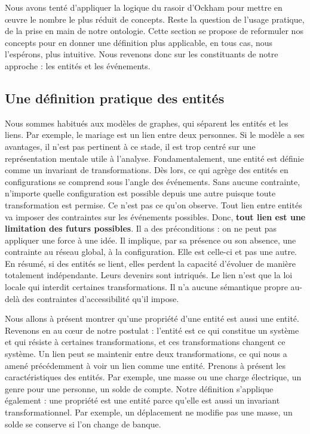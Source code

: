 \documentclass{report}
\begin{document}
	Nous avons tenté d'appliquer la logique du rasoir d'Ockham pour mettre en œuvre le nombre le plus réduit de concepts. Reste la question de l'usage pratique, de la prise en main de notre ontologie. Cette section se propose de reformuler nos concepts pour en donner une définition plus applicable, en tous cas, nous l'espérons, plus intuitive. Nous revenons donc sur les constituants de notre approche : les entités et les événements. 
	
	
	\subsection*{Une définition pratique des entités}
	
		Nous sommes habitués aux modèles de graphes, qui séparent les entités et les liens. Par exemple, le mariage est un lien entre deux personnes. Si le modèle a ses avantages, il n'est pas pertinent à ce stade, il est trop centré sur une représentation mentale utile à l'analyse. Fondamentalement, une entité est définie comme un invariant de transformations. Dès lors, ce qui agrège des entités en configurations se comprend sous l'angle des événements. Sans aucune contrainte, n'importe quelle configuration est possible depuis une autre puisque toute transformation est permise. Ce n'est pas ce qu'on observe. Tout lien entre entités va imposer des contraintes sur les événements possibles. Donc, \textbf{tout lien est une limitation des futurs possibles}. Il a des préconditions : on ne peut pas appliquer une force à une idée. Il implique, par sa présence ou son absence, une contrainte au réseau global, à la configuration. Elle est celle-ci et pas une autre. En résumé, si des entités se lient, elles perdent la capacité d'évoluer de manière totalement indépendante. Leurs devenirs sont intriqués. Le lien n'est que la loi locale qui interdit certaines transformations. Il n'a aucune sémantique propre au-delà des contraintes d'accessibilité qu'il impose.
		
		
		
		Nous allons à présent montrer qu'une propriété d'une entité est aussi une entité. Revenons en au cœur de notre postulat : l'entité est ce qui constitue un système et qui résiste à certaines transformations, et ces transformations changent ce système. Un lien peut se maintenir entre deux transformations, ce qui nous a amené précédemment à voir un lien comme une entité. Prenons à présent les caractéristiques des entités. Par exemple, une masse ou une charge électrique, un genre pour une personne, un solde de compte. Notre définition s'applique également : une propriété est une entité parce qu'elle est aussi un invariant transformationnel. Par exemple, un déplacement ne modifie pas une masse, un solde se conserve si l'on change de banque. 
		
\end{document}

